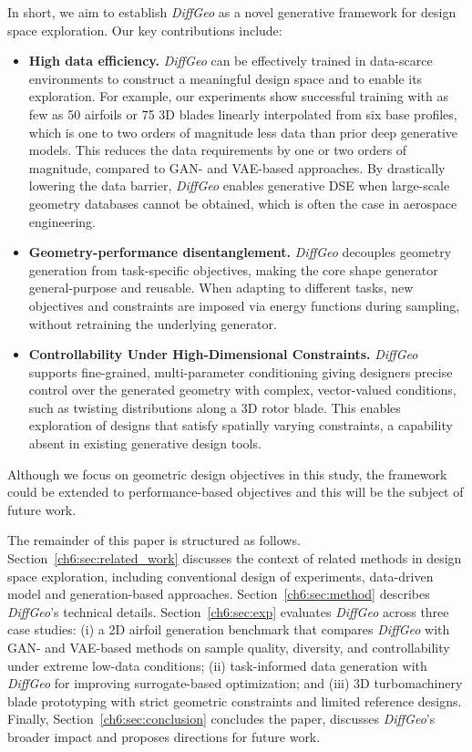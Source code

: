 In short, we aim to establish \textit{DiffGeo} as a novel generative framework for design space exploration. Our key contributions include:
%
\begin{itemize}
    \item \textbf{High data efficiency.} \textit{DiffGeo} can be effectively trained in data-scarce environments to construct a meaningful design space and to enable its exploration. For example, our experiments show successful training with as few as 50 airfoils or 75 3D blades linearly interpolated from six base profiles, which is one to two orders of magnitude less data than prior deep generative models. This reduces the data requirements by one or two orders of magnitude, compared  to GAN- and VAE-based approaches. By drastically lowering the data barrier, \textit{DiffGeo} enables generative DSE when large-scale geometry databases cannot be obtained, which is often the case in aerospace engineering.

    \item \textbf{Geometry-performance disentanglement.} \textit{DiffGeo} decouples geometry generation from task-specific objectives, making the core shape generator general-purpose and reusable. When adapting to different tasks, new objectives and constraints are imposed via energy functions during sampling, without retraining the underlying generator.

    \item \textbf{Controllability Under High-Dimensional Constraints.} \textit{DiffGeo} supports fine-grained, multi-parameter conditioning giving designers precise control over the generated geometry with complex, vector-valued conditions, such as twisting distributions along a 3D rotor blade. This enables exploration of designs that satisfy spatially varying constraints, a capability absent in existing generative design tools.
\end{itemize}
%
Although we focus on geometric design objectives in this study, the framework could be extended to performance-based objectives and this will be the subject of future work. 

The remainder of this paper is structured as follows. Section~\ref{ch6:sec:related_work} discusses the context of related methods in design space exploration, including conventional design of experiments, data-driven model and generation-based approaches. Section~\ref{ch6:sec:method} describes \textit{DiffGeo}'s technical details. Section~\ref{ch6:sec:exp} evaluates \textit{DiffGeo} across three case studies: (i) a 2D airfoil generation benchmark that compares \textit{DiffGeo} with GAN- and VAE-based methods on sample quality, diversity, and controllability under extreme low-data conditions; (ii) task-informed data generation with \textit{DiffGeo} for improving surrogate-based optimization; and (iii) 3D turbomachinery blade prototyping with strict geometric constraints and limited reference designs. Finally, Section~\ref{ch6:sec:conclusion} concludes the paper, discusses \textit{DiffGeo}'s broader impact and proposes directions for future work.